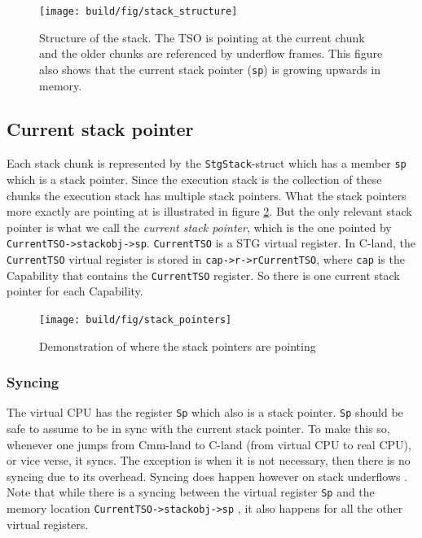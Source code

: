 \begin{figure}
\begin{mdframed}
  \texttt{[image: build/fig/stack\_structure]}
  \caption{Structure of the stack. The TSO is pointing at the current
  chunk and the older chunks are referenced by underflow frames. This
  figure also shows that the current stack pointer (\texttt{sp}) is
  growing upwards in memory.}
  \label{fig:stack_structure}
\end{mdframed}
\end{figure}

\subsection{Current stack pointer}

Each stack chunk is represented by the \texttt{StgStack}-struct
which has a member \texttt{sp} which is a stack pointer.
Since the execution stack is the collection of these chunks the
execution stack has multiple stack pointers. What the stack
pointers more exactly are pointing at is illustrated in figure
\ref{fig:stack_pointers}. But the only relevant stack pointer is what
we call the \emph{current stack pointer}, which is the one pointed by
\texttt{CurrentTSO->stackobj->sp}. \texttt{CurrentTSO} is a STG virtual
register. In C-land, the \texttt{CurrentTSO} virtual register is stored
in \texttt{cap->r->rCurrentTSO}, where \texttt{cap} is the Capability
that contains the \texttt{CurrentTSO} register. So there is one current
stack pointer for each Capability.

\begin{figure}
\begin{mdframed}
  \texttt{[image: build/fig/stack\_pointers]}
  \caption{Demonstration of where the stack pointers are pointing}
  \label{fig:stack_pointers}
\end{mdframed}
\end{figure}

\subsubsection{Syncing}

The virtual CPU has the register \texttt{Sp} which also is a stack
pointer. \texttt{Sp} should be safe to assume to be in sync with
the current stack pointer. To make this so, whenever one jumps
from Cmm-land to C-land (from virtual CPU to real CPU), or vice
verse, it syncs. The exception is when it is not necessary, then there
is no syncing due to its overhead. Syncing does happen however on stack
underflows \cite{github_underflow_frame}. Note that while there is a
syncing between the virtual register \texttt{Sp} and the memory location
\texttt{CurrentTSO->stackobj->sp} \cite{github_sync_sp}, it also happens
for all the other virtual registers.

